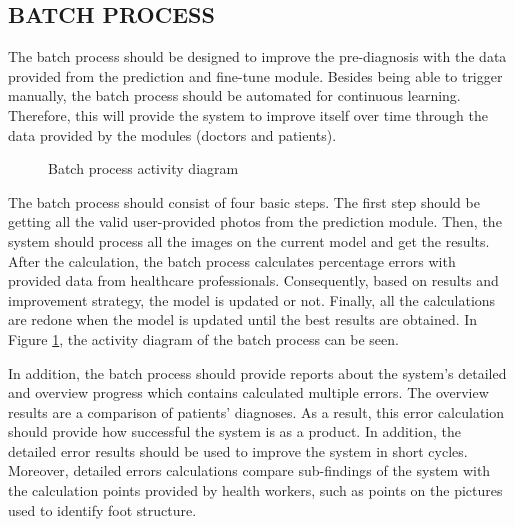 \subsection{ BATCH PROCESS }

The batch process should be designed to improve the pre-diagnosis with the data provided from the prediction and fine-tune module. Besides being able to trigger manually, the batch process should be automated for continuous learning. Therefore, this will provide the system to improve itself over time through the data provided by the modules (doctors and patients). 

\begin{figure}[htbp]
\centering
{}
\caption{Batch process activity diagram}
\label{fig:BatchProcessActivityDiagram}
\end{figure}

The batch process should consist of four basic steps. The first step should be getting all the valid user-provided photos from the prediction module. Then, the system should process all the images on the current model and get the results. After the calculation, the batch process calculates percentage errors with provided data from healthcare professionals. Consequently, based on results and improvement strategy, the model is updated or not. Finally, all the calculations are redone when the model is updated until the best results are obtained. In Figure \ref{fig:BatchProcessActivityDiagram}, the activity diagram of the batch process can be seen.

In addition, the batch process should provide reports about the system's detailed and overview progress which contains calculated multiple errors. The overview results are a comparison of patients' diagnoses. As a result, this error calculation should provide how successful the system is as a product. In addition, the detailed error results should be used to improve the system in short cycles. Moreover, detailed errors calculations compare sub-findings of the system with the calculation points provided by health workers, such as points on the pictures used to identify foot structure. 

